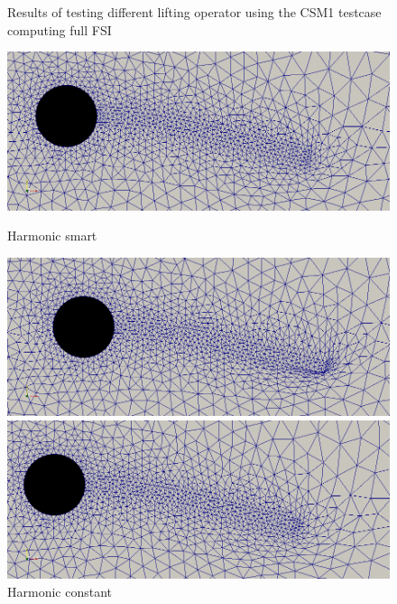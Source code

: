 \begin{figure}[H]  \label{fig:CSM1_pictures} 
  \caption{Results of testing different lifting operator using the CSM1 testcase computing full FSI}
  \begin{minipage}[b]{0.6\linewidth}
    \centering
    \includegraphics[scale=0.25]{./Verification_Validation/Mesh_motion_results/CSM1_laplace.png} 
    \caption{Harmonic smart} 
    \vspace{4ex}
  \end{minipage}%
  \begin{minipage}[b]{0.6\linewidth}
    \centering
    \includegraphics[scale=0.25]{./Verification_Validation/Mesh_motion_results/CSM1_constant.png} 
    \caption{Harmonic constant} 
    \vspace{4ex}
  \end{minipage} 
  \begin{minipage}[b]{0.6\linewidth}
    \centering
    \includegraphics[scale=0.25]{./Verification_Validation/Mesh_motion_results/CSM1_bibc1.png} 

\end{minipage}
\end{figure}
